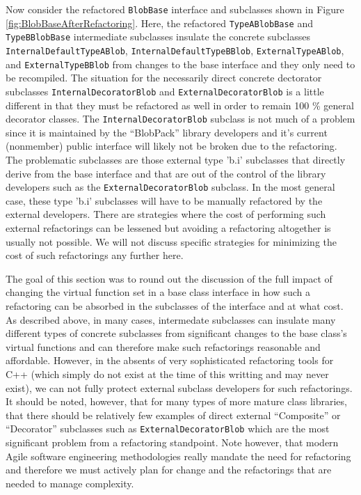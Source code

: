 \documentclass[pdf,ps2pdf,11pt]{SANDreport}
\begin{document}
Now consider the refactored {}\texttt{Blob\-Base} interface and subclasses
shown in Figure {}\ref{fig:BlobBaseAfterRefactoring}.  Here, the refactored
{}\texttt{Type\-A\-Blob\-Base} and {}\texttt{Type\-B\-Blob\-Base} intermediate
subclasses insulate the concrete subclasses
{}\texttt{Internal\-Default\-Type\-A\-Blob},
{}\texttt{Internal\-Default\-Type\-B\-Blob},
{}\texttt{External\-Type\-A\-Blob}, and {}\texttt{External\-Type\-B\-Blob}
from changes to the base interface and they only need to be recompiled.  The
situation for the necessarily direct concrete dectorator subclasses
{}\texttt{Internal\-Decorator\-Blob} and {}\texttt{External\-Decorator\-Blob}
is a little different in that they must be refactored as well in order to
remain 100 \% general decorator classes.  The
{}\texttt{Internal\-Decorator\-Blob} subclass is not much of a problem since
it is maintained by the ``BlobPack'' library developers and it's current
(nonmember) public interface will likely not be broken due to the refactoring.
The problematic subclasses are those external type 'b.i' subclasses that
directly derive from the base interface and that are out of the control of the
library developers such as the {}\texttt{External\-Decorator\-Blob} subclass.
In the most general case, these type 'b.i' subclasses will have to be manually
refactored by the external developers.  There are strategies where the cost of
performing such external refactorings can be lessened but avoiding a
refactoring altogether is usually not possible.  We will not discuss specific
strategies for minimizing the cost of such refactorings any further here.

The goal of this section was to round out the discussion of the full impact of
changing the virtual function set in a base class interface in how such a
refactoring can be absorbed in the subclasses of the interface and at what
cost.  As described above, in many cases, intermedate subclasses can insulate
many different types of concrete subclasses from significant changes to the
base class's virtual functions and can therefore make such refactorings
reasonable and affordable.  However, in the absents of very sophisticated
refactoring tools for C++ (which simply do not exist at the time of this
writting and may never exist), we can not fully protect external subclass
developers for such refactorings.  It should be noted, however, that for many
types of more mature class libraries, that there should be relatively few
examples of direct external ``Composite'' or ``Decorator'' subclasses such as
{}\texttt{External\-Decorator\-Blob} which are the most significant problem
from a refactoring standpoint.  Note however, that modern Agile software
engineering methodologies really mandate the need for refactoring and
therefore we must actively plan for change and the refactorings that are
needed to manage complexity.
\end{document}
